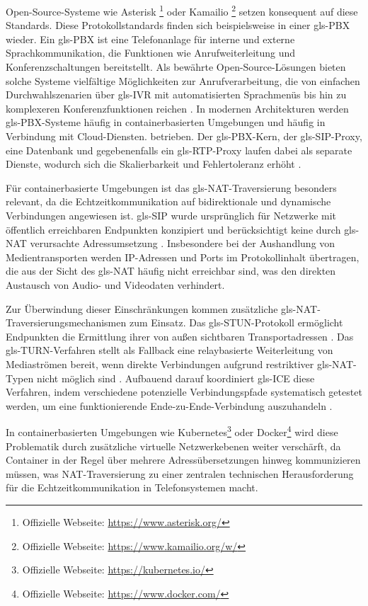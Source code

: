 Open-Source-Systeme wie Asterisk \footnote{Offizielle Webseite: \url{https://www.asterisk.org/}} oder Kamailio \footnote{Offizielle Webseite: \url{https://www.kamailio.org/w/}} setzen konsequent auf diese Standards. Diese Protokollstandards finden sich beispielsweise in einer \gls{gls-PBX} wieder. Ein \gls{gls-PBX} ist eine Telefonanlage für interne und externe Sprachkommunikation, die Funktionen wie Anrufweiterleitung und Konferenzschaltungen bereitstellt. Als bewährte Open-Source-Lösungen bieten solche Systeme vielfältige Möglichkeiten zur Anrufverarbeitung, die von einfachen Durchwahlszenarien über \gls{gls-IVR} mit automatisierten Sprachmenüs bis hin zu komplexeren Konferenzfunktionen reichen \parencite{Antonova2025}. In modernen Architekturen werden \gls{gls-PBX}-Systeme häufig in containerbasierten Umgebungen und häufig in Verbindung mit Cloud-Diensten. betrieben. Der \gls{gls-PBX}-Kern, der \gls{gls-SIP}-Proxy, eine Datenbank und gegebenenfalls ein \gls{gls-RTP}-Proxy laufen dabei als separate Dienste, wodurch sich die Skalierbarkeit und Fehlertoleranz erhöht \parencite{Antonova2025,ReliabilityVirtualizedNetworks}.

Für containerbasierte Umgebungen ist das \gls{gls-NAT}-Traversierung besonders relevant, da die Echtzeitkommunikation auf bidirektionale und dynamische Verbindungen angewiesen ist. \gls{gls-SIP} wurde ursprünglich für Netzwerke mit öffentlich erreichbaren Endpunkten konzipiert und berücksichtigt keine durch \gls{gls-NAT} verursachte Adressumsetzung \parencite{rfc3261}. Insbesondere bei der Aushandlung von Medientransporten werden IP-Adressen und Ports im Protokollinhalt übertragen, die aus der Sicht des \gls{gls-NAT} häufig nicht erreichbar sind, was den direkten Austausch von Audio- und Videodaten verhindert.

Zur Überwindung dieser Einschränkungen kommen zusätzliche \gls{gls-NAT}-Traversierungsmechanismen zum Einsatz. Das \gls{gls-STUN}-Protokoll ermöglicht Endpunkten die Ermittlung ihrer von au\ss en sichtbaren Transportadressen \parencite{rfc5389}. Das \gls{gls-TURN}-Verfahren stellt als Fallback eine relaybasierte Weiterleitung von Mediaströmen bereit, wenn direkte Verbindungen aufgrund restriktiver \gls{gls-NAT}-Typen nicht möglich sind \parencite{rfc5766}. Aufbauend darauf koordiniert \gls{gls-ICE} diese Verfahren, indem verschiedene potenzielle Verbindungspfade systematisch getestet werden, um eine funktionierende Ende-zu-Ende-Verbindung auszuhandeln \parencite{rfc5245}.

In containerbasierten Umgebungen wie Kubernetes\footnote{Offizielle Webseite: \url{https://kubernetes.io/}} oder Docker\footnote{Offizielle Webseite: \url{https://www.docker.com/}} wird diese Problematik durch zusätzliche virtuelle Netzwerkebenen weiter verschärft, da Container in der Regel über mehrere Adressübersetzungen hinweg kommunizieren müssen, was NAT-Traversierung zu einer zentralen technischen Herausforderung für die Echtzeitkommunikation in Telefonsystemen macht\parencite{Antonova2025,ReliabilityVirtualizedNetworks}.

